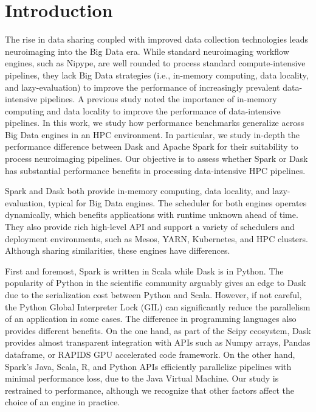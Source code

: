 \documentclass[conference]{IEEEtran}
\begin{document}
\section{Introduction}
The rise in data sharing coupled with improved data collection technologies leads neuroimaging into the Big Data era\cite{ALFAROALMAGRO:18, van2014human, ConpPortal}.
While standard neuroimaging workflow engines, such as Nipype\cite{Nipype:11}, are well rounded to process standard compute-intensive pipelines,
they lack Big Data strategies (i.e., in-memory computing, data locality, and lazy-evaluation) to improve the performance of increasingly prevalent data-intensive pipelines.
A previous study\cite{hayot2019performance} noted the importance of in-memory computing and data locality to improve the performance of data-intensive pipelines.
In this work, we study how performance benchmarks generalize across Big Data engines in an HPC environment.
In particular, we study in-depth the performance difference between Dask\cite{Dask:15} and Apache Spark\cite{Spark:16} for their suitability to process neuroimaging pipelines.
Our objective is to assess whether Spark or Dask has substantial performance benefits in processing data-intensive HPC pipelines.

Spark and Dask both provide in-memory computing, data locality, and lazy-evaluation, typical for Big Data engines.
The scheduler for both engines operates dynamically, which benefits applications with runtime unknown ahead of time\cite{Dask:15}.
They also provide rich high-level API and support a variety of schedulers and deployment environments, such as Mesos\cite{hindman2011mesos}, YARN\cite{vavilapalli2013apache}, Kubernetes, and HPC clusters.
Although sharing similarities, these engines have differences.

First and foremost, Spark is written in Scala while Dask is in Python.
The popularity of Python in the scientific community arguably gives an edge to Dask due to the serialization cost between Python and Scala.
However, if not careful, the Python Global Interpreter Lock (GIL) can significantly reduce the parallelism of an application in some cases.
The difference in programming languages also provides different benefits.
On the one hand, as part of the Scipy ecosystem, Dask provides almost transparent integration with APIs such as Numpy arrays, Pandas dataframe, or RAPIDS GPU accelerated code framework.
On the other hand, Spark's Java, Scala, R, and Python APIs efficiently parallelize pipelines with minimal performance loss, due to the Java Virtual Machine.
Our study is restrained to performance, although we recognize that other factors affect the choice of an engine in practice.
\end{document}
